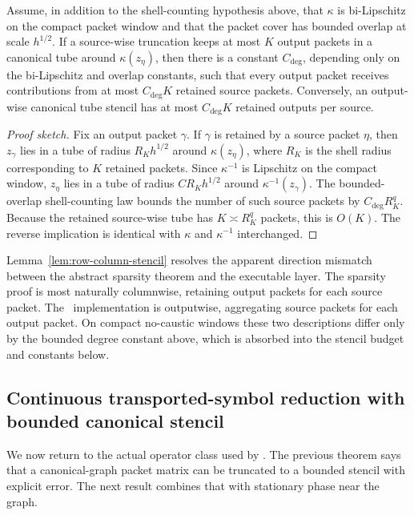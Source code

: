\begin{lemma}
\label{lem:row-column-stencil}
Assume, in addition to the shell-counting hypothesis above, that $\kappa$ is bi-Lipschitz on the compact packet window and that the packet cover has bounded overlap at scale $h^{1/2}$.  If a source-wise truncation keeps at most $K$ output packets in a canonical tube around $\kappa(z_\eta)$, then there is a constant $C_{\mathrm{deg}}$, depending only on the bi-Lipschitz and overlap constants, such that every output packet receives contributions from at most $C_{\mathrm{deg}}K$ retained source packets.  Conversely, an output-wise canonical tube stencil has at most $C_{\mathrm{deg}}K$ retained outputs per source.
\end{lemma}

\begin{proof}[Proof sketch]
Fix an output packet $\gamma$.  If $\gamma$ is retained by a source packet $\eta$, then $z_\gamma$ lies in a tube of radius $R_Kh^{1/2}$ around $\kappa(z_\eta)$, where $R_K$ is the shell radius corresponding to $K$ retained packets.  Since $\kappa^{-1}$ is Lipschitz on the compact window, $z_\eta$ lies in a tube of radius $C R_Kh^{1/2}$ around $\kappa^{-1}(z_\gamma)$.  The bounded-overlap shell-counting law bounds the number of such source packets by $C_{\mathrm{deg}}R_K^q$.  Because the retained source-wise tube has $K\asymp R_K^q$ packets, this is $O(K)$.  The reverse implication is identical with $\kappa$ and $\kappa^{-1}$ interchanged.
\end{proof}

Lemma~\ref{lem:row-column-stencil} resolves the apparent direction mismatch between the abstract sparsity theorem and the executable layer.  The sparsity proof is most naturally columnwise, retaining output packets for each source packet.  The \MiNO\ implementation is outputwise, aggregating source packets for each output packet.  On compact no-caustic windows these two descriptions differ only by the bounded degree constant above, which is absorbed into the stencil budget and constants below.

\subsection{Continuous transported-symbol reduction with bounded canonical stencil}

We now return to the actual operator class used by \MiNO. The previous theorem says that a canonical-graph packet matrix can be truncated to a bounded stencil with explicit error. The next result combines that with stationary phase near the graph.


